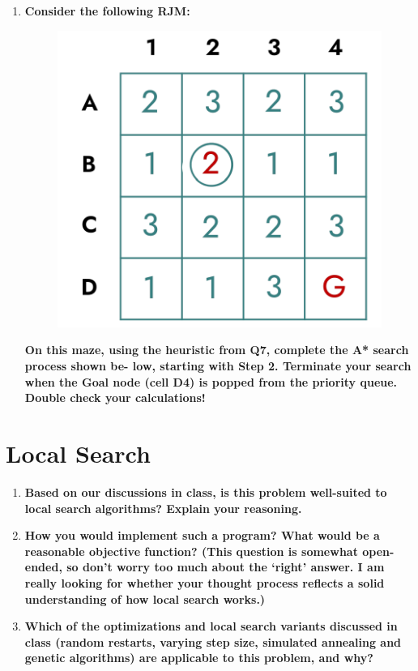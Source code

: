 \documentclass[a4paper]{article}
\begin{document}
\begin{sloppypar}
\begin{enumerate}[start=6,label=Q\arabic*,left=0pt]
    \item \textbf{Consider the following RJM:}
    \begin{figure}[H]
        \centering  
        \includegraphics[height=0.2\textheight]{Q8_RJM.png}
        \label{fig:Q8_RJM}
    \end{figure}
    \textbf{On this maze, using the heuristic from Q7, complete the A* search process shown be- low, starting with Step 2. Terminate your search when the Goal node (cell D4) is popped from the priority queue. Double check your calculations!}

\end{enumerate}

\section{Local Search}

\begin{enumerate}[start=9,label=Q\arabic*,left=0pt]
    \item \textbf{Based on our discussions in class, is this problem well-suited to local search algorithms? Explain your reasoning.}
    \item \textbf{How you would implement such a program? What would be a reasonable objective function? (This question is somewhat open-ended, so don’t worry too much about the ‘right’ answer. I am really looking for whether your thought process reflects a solid understanding of how local search works.)}
    \item \textbf{Which of the optimizations and local search variants discussed in class (random restarts, varying step size, simulated annealing and genetic algorithms) are applicable to this problem, and why?}


\end{enumerate}
\end{sloppypar}
\end{document}
